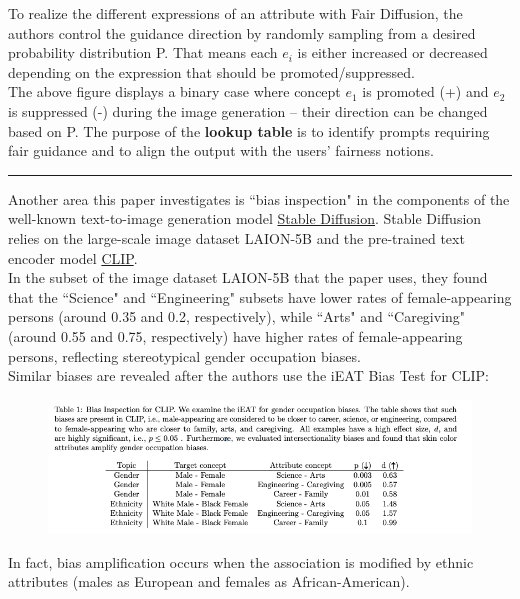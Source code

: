 \documentclass[12pt]{amsart}
\begin{document}
To realize the different expressions of an attribute with Fair
Diffusion, the authors control the guidance direction by randomly sampling from a desired probability distribution P. That
means each $e_i$ is either increased or decreased depending on the expression that should be promoted/suppressed. \\

The above figure displays a binary case  where concept $e_1$ is promoted (+) and $e_2$ is suppressed (-) during the image
generation -- their direction can be changed based on P. The purpose of the \textbf{lookup table} is to identify prompts requiring fair guidance and to align the output with the users’ fairness notions.


\noindent\rule{\textwidth}{1pt}

\vspace{0.5cm}
Another area this paper investigates is ``bias inspection" in the components of the well-known text-to-image generation model \href{https://huggingface.co/blog/stable_diffusion}{Stable Diffusion}. Stable Diffusion relies on the large-scale image dataset LAION-5B and the pre-trained text encoder model \href{https://huggingface.co/docs/transformers/model_doc/clip#transformers.CLIPTextModel}{CLIP}. \\

In the subset of the image dataset LAION-5B that the paper uses, they found that the ``Science" and ``Engineering" subsets have lower rates of female-appearing persons (around 0.35 and 0.2, respectively), while ``Arts" and ``Caregiving" (around 0.55 and 0.75, respectively) have higher rates of female-appearing persons, reflecting stereotypical gender occupation biases. \\

Similar biases are revealed after the authors use the iEAT Bias Test for CLIP: \\

\begin{figure}[H]
    \centering
\includegraphics[scale = 0.6]{FairDiffusion_CLIP_Bias.png}
    \label{fig:clip_bias}
\end{figure}
In fact, bias amplification occurs when the association is modified by ethnic attributes (males as European and females as African-American). \\
\end{document}
